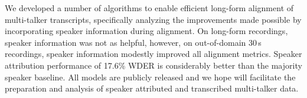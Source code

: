We developed a number of algorithms to enable efficient long-form alignment of multi-talker transcripts, specifically analyzing the improvements made possible by incorporating speaker information during alignment. On long-form recordings, speaker information was not as helpful, however, on out-of-domain 30\,s recordings, speaker information modestly improved all alignment metrics. Speaker attribution performance of 17.6\% WDER is considerably better than the majority speaker baseline. All models are publicly released and we hope will facilitate the preparation and analysis of speaker attributed and transcribed multi-talker data. 